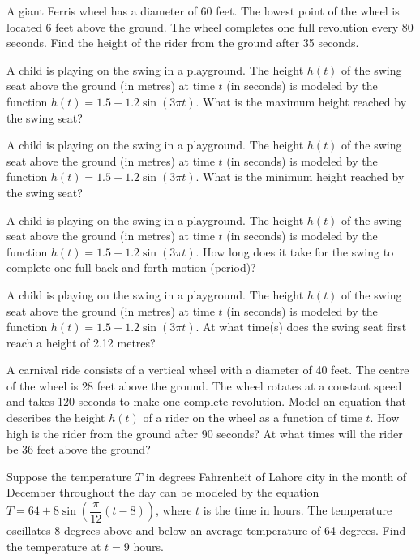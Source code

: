 \documentclass[11pt,a4paper]{article}
\begin{document}
\begin{longlist}
\item A giant Ferris wheel has a diameter of 60 feet. The lowest point of the wheel is located 6 feet above the ground. The wheel completes one full revolution every 80 seconds. Find the height of the rider from the ground after 35 seconds.

\item A child is playing on the swing in a playground. The height $h(t)$ of the swing seat above the ground (in metres) at time $t$ (in seconds) is modeled by the function $h(t)=1.5+1.2\sin(3\pi t)$. What is the maximum height reached by the swing seat?

\item A child is playing on the swing in a playground. The height $h(t)$ of the swing seat above the ground (in metres) at time $t$ (in seconds) is modeled by the function $h(t)=1.5+1.2\sin(3\pi t)$. What is the minimum height reached by the swing seat?

\item A child is playing on the swing in a playground. The height $h(t)$ of the swing seat above the ground (in metres) at time $t$ (in seconds) is modeled by the function $h(t)=1.5+1.2\sin(3\pi t)$. How long does it take for the swing to complete one full back-and-forth motion (period)?

\item A child is playing on the swing in a playground. The height $h(t)$ of the swing seat above the ground (in metres) at time $t$ (in seconds) is modeled by the function $h(t)=1.5+1.2\sin(3\pi t)$. At what time(s) does the swing seat first reach a height of 2.12 metres?

\item A carnival ride consists of a vertical wheel with a diameter of 40 feet. The centre of the wheel is 28 feet above the ground. The wheel rotates at a constant speed and takes 120 seconds to make one complete revolution. Model an equation that describes the height $h(t)$ of a rider on the wheel as a function of time $t$. How high is the rider from the ground after 90 seconds? At what times will the rider be 36 feet above the ground?

\item Suppose the temperature $T$ in degrees Fahrenheit of Lahore city in the month of December throughout the day can be modeled by the equation $T = 64+8\sin\left(\dfrac{\pi}{12}(t-8)\right)$, where $t$ is the time in hours. The temperature oscillates 8 degrees above and below an average temperature of 64 degrees. Find the temperature at $t=9$ hours.


\end{longlist}
\end{document}
